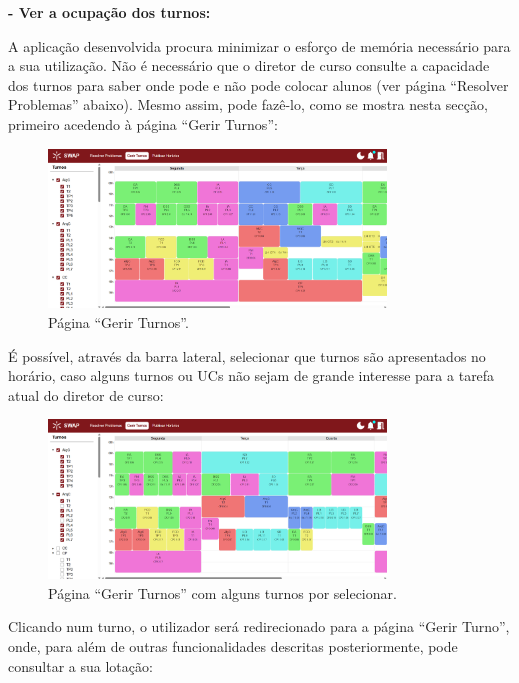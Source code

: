 \documentclass[12pt, a4paper]{article}
\begin{document}
\textbf{- Ver a ocupação dos turnos:}

A aplicação desenvolvida procura minimizar o esforço de memória necessário para a sua utilização.
Não é necessário que o diretor de curso consulte a capacidade dos turnos para saber onde pode e não
pode colocar alunos (ver página ``Resolver Problemas'' abaixo). Mesmo assim, pode fazê-lo, como se
mostra nesta secção, primeiro acedendo à página ``Gerir Turnos'':

\begin{figure}[H]
    \centering
    \includegraphics[width=0.8\textwidth]{res/manual/gerir_turnos.png}
    \caption{Página ``Gerir Turnos''.}
    \label{gerir_turnos}
\end{figure}

É possível, através da barra lateral, selecionar que turnos são apresentados no horário, caso alguns
turnos ou UCs não sejam de grande interesse para a tarefa atual do diretor de curso:

\begin{figure}[H]
    \centering
    \includegraphics[width=0.8\textwidth]{res/manual/gerir_turnos_filtrados.png}
    \caption{Página ``Gerir Turnos'' com alguns turnos por selecionar.}
    \label{gerir_turnos_filtrados}
\end{figure}

Clicando num turno, o utilizador será redirecionado para a página ``Gerir Turno'', onde, para além
de outras funcionalidades descritas posteriormente, pode consultar a sua lotação:
\end{document}
